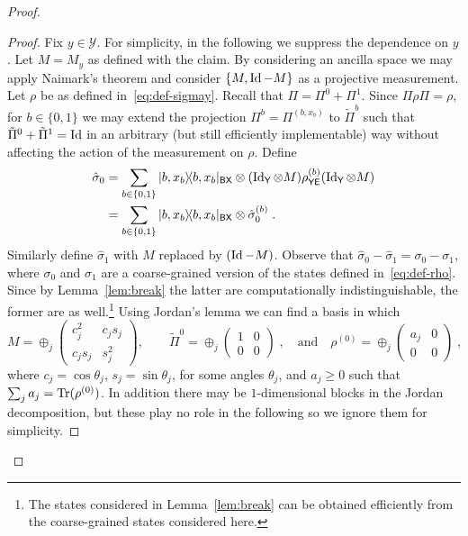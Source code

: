\documentclass[11pt]{article}
\theoremstyle{remark}
\theoremstyle{definition}
\newcommand{\ket}[1]{|#1\rangle}
\newcommand{\bra}[1]{\langle#1|}
\newcommand{\proj}[1]{\ket{#1}\!\bra{#1}}
\newcommand{\Tr}{\mbox{\rm Tr}}
\newcommand{\Id}{\ensuremath{\mathop{\rm Id}\nolimits}}
\newcommand{\reg}[1]{{\textsf{#1}}}
\newcommand{\mY}{\ensuremath{\mathcal{Y}}}
\begin{document}
\begin{proof}
\begin{proof}
Fix $y\in \mY$. For simplicity, in the following we suppress the dependence on $y$. %
Let $M=M_y$ as defined with the claim. By considering an ancilla space we may apply Naimark's theorem and consider $\{M,\Id-M\}$ %
as a projective measurement. %
 Let $\rho$ be as defined in~\eqref{eq:def-sigmay}. Recall that $\Pi = \Pi^{0}+\Pi^1$. Since $\Pi \rho \Pi = \rho$, for $b\in\{0,1\}$ we may extend the projection $\Pi^b = \Pi^{(b,x_b)}$ to $\tilde{\Pi}^b$ such that $\tilde{\Pi}^0 + \tilde{\Pi}^1 = \Id$ in an arbitrary (but still efficiently implementable) way without affecting the action of the measurement on $\rho$. %
Define
\begin{align}
\hat{\sigma}_0 &=\sum_{b\in\{0,1\}} \proj{b,x_b}_{\reg{BX}} \otimes  (\Id_\reg{Y}\otimes M) \rho^{(b)}_{\reg{YE}} (\Id_\reg{Y}\otimes M)\notag\\
 &=\sum_{b\in\{0,1\}} \proj{b,x_b}_{\reg{BX}} \otimes  \hat{\sigma}_0^{(b)}\;.\label{eq:def-hat-rho}
\end{align}
Similarly define $\hat{\sigma}_1$ with $M$ replaced by $(\Id-M)$. Observe that $\hat{\sigma}_0 - \hat{\sigma}_1 = \sigma_0-\sigma_1$, where $\sigma_0$ and $\sigma_1$ are a coarse-grained version of the states defined in~\eqref{eq:def-rho}. Since by Lemma~\ref{lem:break} the latter are computationally indistinguishable, the former are as well.\footnote{The states considered in Lemma~\ref{lem:break} can be obtained efficiently from the coarse-grained states considered here.}  Using Jordan's lemma we can find a basis in which  
\begin{equation}\label{eq:n-form}
M = \oplus_j \begin{pmatrix} c_j^2 & c_js_j \\ c_js_j & s_j^2 \end{pmatrix},\qquad \tilde{\Pi}^0 = \oplus_j \begin{pmatrix} 1 & 0 \\ 0 & 0 \end{pmatrix}\;,\quad \text{and}\quad \rho^{(0)} = \oplus_j \begin{pmatrix} a_j & 0 \\ 0 & 0 \end{pmatrix}\;,
\end{equation}
where $c_j= \cos \theta_j$, $s_j=\sin \theta_j$, for some angles $\theta_j$, and $a_j \geq 0$ such that $\sum_j a_j = \Tr(\rho^{(0)})$. In addition there may be $1$-dimensional blocks in the Jordan decomposition, but these play no role in the following so we ignore them for simplicity. 


\end{proof}
\end{proof}
\end{document}
